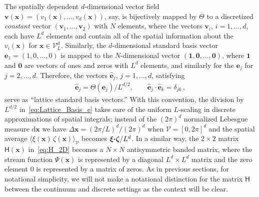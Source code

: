 \documentclass[english,12pt,jmp,graphicx]{revtex4-1}
\newcommand{\vecx}{\boldsymbol{x}}
\newcommand{\vecv}{\boldsymbol{v}}
\newcommand{\vecxi}{\boldsymbol{\xi}}
\newcommand{\veczeta}{\boldsymbol{\zeta}}
\newcommand{\vece}{\boldsymbol{e}}
\newcommand{\bcdot}{\mbox{\boldmath${\cdot}$}}
\newcommand{\Vc}{\mathcal{V}}
\renewcommand{\d}{\mathrm{d}}
\newcommand{\hate}{\hat{\mathbf{e}}}
\newcommand{\Hm}{\mathsf{H}}
\begin{document}
The spatially dependent $d$-dimensional
vector field $\vecv(\vecx)=(v_1(\vecx),\ldots,v_d(\vecx))$, say, is
bijectively mapped by $\Theta$ to a discretized \emph{constant} vector 
$(\vecv_1,\ldots,\vecv_2)$ with $N$ elements, where the vectors $\vecv_i$,
$i=1,\ldots,d$, each have $L^d$ elements and contain all of
the spatial information about the $v_i(\vecx)$ for $\vecx\in\Vc_L^d$.
Similarly, the $d$-dimensional standard basis vector 
$\vece_1=(1,0,\ldots,0)$ is mapped to the $N$-dimensional vector
$(\mathbf{1},\mathbf{0},\ldots,\mathbf{0})$, where $\mathbf{1}$ and
$\mathbf{0}$ are vectors of ones and zeros with $L^d$ elements, and
similarly for the $\vece_j$ for $j=2,\ldots,d$. Therefore, the vectors
$\hate_j$, $j=1,\ldots,d$, satisfying      
%
\begin{align}\label{eq:Lattice_Basis_e}
  \hate_j=\Theta(\vece_j)/L^{d/2},
  \qquad
  \hate_j\cdot\hate_k=\delta_{jk}\,,
\end{align}
%
serve as ``lattice standard basis vectors.''
With this convention, the division by $L^{d/2}$
in~\eqref{eq:Lattice_Basis_e} takes care of the uniform $L$-scaling in
discrete approximations of spatial integrals; instead of
the $(2\pi)^d$ normalized 
Lebesgue measure $\d\vecx$ we have $\Delta\vecx=(2\pi/L)^d/(2\pi)^d$
when $\Vc=[0,2\pi]^d$ and the spatial 
average $\langle\xi(\vecx)\,\zeta(\vecx)\rangle_{\Vc}$ becomes
$\vecxi\bcdot\veczeta/L^d$. In a similar way, the $2\times2$ matrix
$\Hm(\vecx)$ in~\eqref{eq:H_2D} becomes a $N\times N$ antisymmetric
banded matrix, where the stream function 
$\Psi(\vecx)$ is represented by a diagonal $L^d\times L^d$ matrix and
the zero element $0$ is represented by a matrix of zeros.
As in previous sections, for
notational simplicity, we will not make a notational distinction for
the matrix $\Hm$ between the continuum and discrete settings as the
context will be clear.  





 
\end{document}
